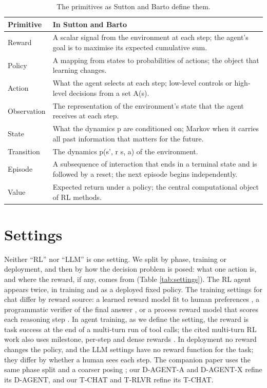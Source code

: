 \documentclass{article}
\begin{document}
\begin{table}[!htb]
\centering\small\setlength{\tabcolsep}{3pt}
\caption{The primitives as Sutton and Barto define them.}\label{tab:primitives}
\begin{tabularx}{\textwidth}{@{}l>{\raggedright\arraybackslash}X@{}}
\toprule
Primitive & In Sutton and Barto \\
\midrule
Reward & A scalar signal from the environment at each step; the agent's goal is to maximise its expected cumulative sum. \\
Policy & A mapping from states to probabilities of actions; the object that learning changes. \\
Action & What the agent selects at each step; low-level controls or high-level decisions from a set A(s). \\
Observation & The representation of the environment's state that the agent receives at each step. \\
State & What the dynamics p are conditioned on; Markov when it carries all past information that matters for the future. \\
Transition & The dynamics p(s', r \textbar{} s, a) of the environment. \\
Episode & A subsequence of interaction that ends in a terminal state and is followed by a reset; the next episode begins independently. \\
Value & Expected return under a policy; the central computational object of RL methods. \\
\bottomrule
\end{tabularx}
\end{table}

\hypertarget{sec:settings}{%
\section{Settings}\label{sec:settings}}

Neither ``RL'' nor ``LLM'' is one setting. We split by phase, training or deployment, and then by how the decision problem is posed: what one action is, and where the reward, if any, comes from (Table \ref{tab:settings}). The RL agent appears twice, in training and as a deployed fixed policy. The training settings for chat differ by reward source: a learned reward model fit to human preferences \citep{christiano2017, ouyang2022}, a programmatic verifier of the final answer \citep{lambert2024, deepseekai2025}, or a process reward model that scores each reasoning step \citep{uesato2022, lightman2024}. In agent training, as we define the setting, the reward is task success at the end of a multi-turn run of tool calls; the cited multi-turn RL work also uses milestone, per-step and dense rewards \citep{zhou2024b}. In deployment no reward changes the policy, and the LLM settings have no reward function for the task; they differ by whether a human sees each step. The companion paper uses the same phase split and a coarser posing \citep{debunking2026}; our D-AGENT-A and D-AGENT-X refine its D-AGENT, and our T-CHAT and T-RLVR refine its T-CHAT.
\end{document}
